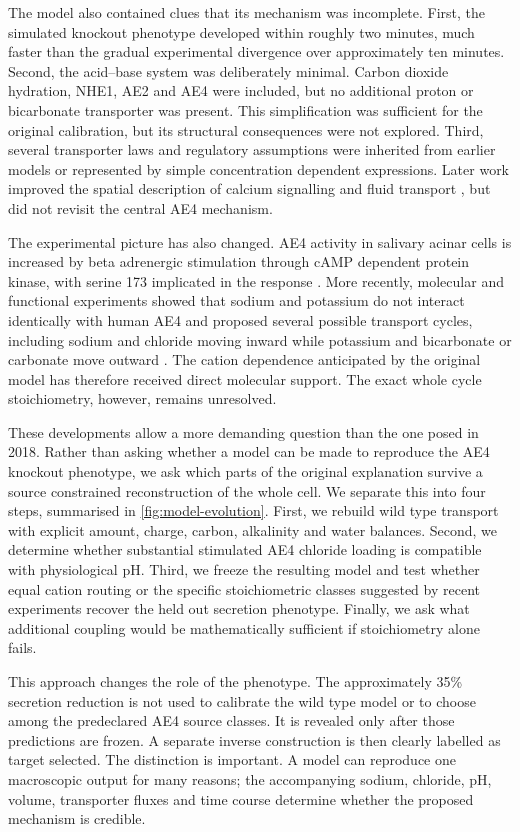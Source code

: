 The model also contained clues that its mechanism was incomplete. First, the simulated knockout phenotype developed within roughly two minutes, much faster than the gradual experimental divergence over approximately ten minutes. Second, the acid--base system was deliberately minimal. Carbon dioxide hydration, NHE1, AE2 and AE4 were included, but no additional proton or bicarbonate transporter was present. This simplification was sufficient for the original calibration, but its structural consequences were not explored. Third, several transporter laws and regulatory assumptions were inherited from earlier models or represented by simple concentration dependent expressions. Later work improved the spatial description of calcium signalling and fluid transport \citep{VeraSiguenza2019Fluid,Pages2019,VeraSiguenza2020,Sneyd2021}, but did not revisit the central AE4 mechanism.

The experimental picture has also changed. AE4 activity in salivary acinar cells is increased by beta adrenergic stimulation through cAMP dependent protein kinase, with serine 173 implicated in the response \citep{PenaMunzenmayer2021}. More recently, molecular and functional experiments showed that sodium and potassium do not interact identically with human AE4 and proposed several possible transport cycles, including sodium and chloride moving inward while potassium and bicarbonate or carbonate move outward \citep{Catalan2025}. The cation dependence anticipated by the original model has therefore received direct molecular support. The exact whole cycle stoichiometry, however, remains unresolved.

These developments allow a more demanding question than the one posed in 2018. Rather than asking whether a model can be made to reproduce the AE4 knockout phenotype, we ask which parts of the original explanation survive a source constrained reconstruction of the whole cell. We separate this into four steps, summarised in \cref{fig:model-evolution}. First, we rebuild wild type transport with explicit amount, charge, carbon, alkalinity and water balances. Second, we determine whether substantial stimulated AE4 chloride loading is compatible with physiological pH. Third, we freeze the resulting model and test whether equal cation routing or the specific stoichiometric classes suggested by recent experiments recover the held out secretion phenotype. Finally, we ask what additional coupling would be mathematically sufficient if stoichiometry alone fails.

This approach changes the role of the phenotype. The approximately 35\% secretion reduction is not used to calibrate the wild type model or to choose among the predeclared AE4 source classes. It is revealed only after those predictions are frozen. A separate inverse construction is then clearly labelled as target selected. The distinction is important. A model can reproduce one macroscopic output for many reasons; the accompanying sodium, chloride, pH, volume, transporter fluxes and time course determine whether the proposed mechanism is credible.

